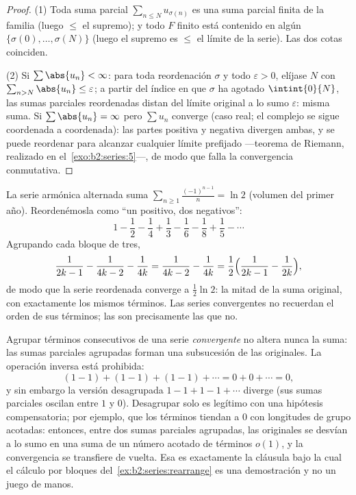 \begin{proof}
(1) Toda suma parcial $\sum_{n \leq N} u_{\sigma(n)}$ es una suma
parcial finita de la familia (luego $\leq$ el supremo); y todo $F$
finito está contenido en algún $\{\sigma(0), \dots, \sigma(N)\}$
(luego el supremo es $\leq$ el límite de la serie). Las dos cotas
coinciden.

(2) Si $\sum\abs{u_n} < \infty$: para toda reordenación $\sigma$ y
todo $\varepsilon > 0$, elíjase $N$ con $\sum_{n > N}\abs{u_n} \leq
\varepsilon$; a partir del índice en que $\sigma$ ha agotado
$\intint{0}{N}$, las sumas parciales reordenadas distan del límite
original a lo sumo $\varepsilon$: misma suma. Si $\sum \abs{u_n} =
\infty$ pero $\sum u_n$ converge (caso real; el complejo se sigue
coordenada a coordenada): las partes positiva y negativa divergen
ambas, y se puede reordenar para alcanzar cualquier límite prefijado
---teorema de Riemann, realizado en el~\cref{exo:b2:series:5}---,
de modo que falla la convergencia conmutativa.
\end{proof}

\begin{example}\label{ex:b2:series:rearrange}
La serie armónica alternada suma
$\sum_{n\geq1}\frac{(-1)^{n-1}}{n} = \ln 2$ (volumen del primer
año). Reordenémosla como ``un positivo, dos negativos'':
\[
1 - \frac12 - \frac14 + \frac13 - \frac16 - \frac18 + \frac15 -
\cdots
\]
Agrupando cada bloque de tres,
\[
\frac{1}{2k-1} - \frac{1}{4k-2} - \frac1{4k}
= \frac{1}{4k-2} - \frac{1}{4k}
= \frac12\Bigl(\frac{1}{2k-1} - \frac1{2k}\Bigr),
\]
de modo que la serie reordenada converge a $\frac12\ln 2$: la mitad
de la suma original, con exactamente los mismos términos. Las
series convergentes no  recuerdan el orden de sus
términos; las  son precisamente las que no.
\end{example}

\begin{example}\label{ex:b2:series:grouping}
Agrupar términos consecutivos de una serie \emph{convergente} no
altera nunca la suma: las sumas parciales agrupadas forman una
subsucesión de las originales. La operación inversa está
prohibida:
\[
(1 - 1) + (1 - 1) + (1 - 1) + \cdots = 0 + 0 + \cdots = 0,
\]
y sin embargo la versión desagrupada $1 - 1 + 1 - 1 + \cdots$
diverge (sus sumas parciales oscilan entre $1$ y $0$). Desagrupar
solo es legítimo con una hipótesis compensatoria; por ejemplo, que
los términos tiendan a $0$ con longitudes de grupo acotadas:
entonces, entre dos sumas parciales agrupadas, las originales se
desvían a lo sumo en una suma de un número acotado de términos
$o(1)$, y la convergencia se transfiere de vuelta. Esa es
exactamente la cláusula bajo la cual el cálculo por bloques del~\cref{ex:b2:series:rearrange} es una demostración y no un juego de
manos.
\end{example}

